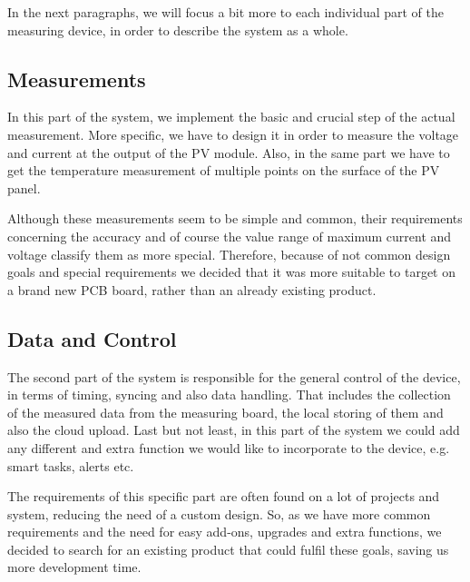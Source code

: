 In the next paragraphs, we will focus a bit more to each individual part of the measuring device, in order to describe the system as a whole.

\subsection{Measurements}
In this part of the system, we implement the basic and crucial step of the actual measurement. More specific, we have to design it in order to measure the voltage and current at the output of the PV module. Also, in the same part we have to get the temperature measurement of multiple points on the surface of the PV panel.

Although these measurements seem to be simple and common, their requirements concerning the accuracy and of course the value range of maximum current and voltage classify them as more special. Therefore, because of not common  design goals and special requirements we decided that it was more suitable to target on a brand new PCB board, rather than an already existing product.

\subsection{Data and Control}
The second part of the system is responsible for the general control of the device, in terms of timing, syncing and also data handling. That includes the collection of the measured data from the measuring board, the local storing of them and also the cloud upload. Last but not least, in this part of the system we could add any different and extra function we would like to incorporate to the device, e.g. smart tasks, alerts etc.

The requirements of this specific part are often found on a lot of projects and system, reducing the need of a custom design. So, as we have more common requirements and the need for easy add-ons, upgrades and extra functions, we decided to search for an existing product that could fulfil these goals, saving us more development time.